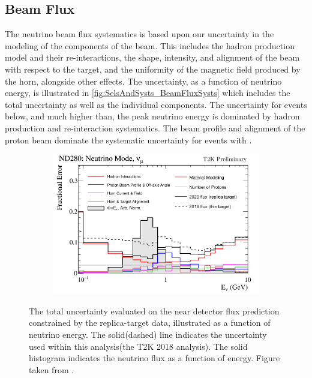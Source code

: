 \subsection{Beam Flux}
\label{sec:SelsAndSysts_Systs_BeamFlux}

The neutrino beam flux systematics is based upon our uncertainty in the modeling of the components of the beam. This includes the hadron production model and their re-interactions, the shape, intensity, and alignment of the beam with respect to the target, and the uniformity of the magnetic field produced by the horn, alongside other effects. The uncertainty, as a function of neutrino energy, is illustrated in \autoref{fig:SelsAndSysts_BeamFluxSysts} which includes the total uncertainty as well as the individual components. The uncertainty for events below, and much higher than, the peak neutrino energy is dominated by hadron production and re-interaction systematics. The beam profile and alignment of the proton beam dominate the systematic uncertainty for events with . 

\begin{figure}[h]
  \begin{subfigure}[t]{\textwidth}
    \includegraphics[width=\textwidth, trim={0mm 0mm 0mm 0mm}, clip,page=1]{Figures/Selections/flux_uncertainty_covariance_plots_addcorrnd_compwv3_flux_error_t2k_nd5_fhc_numu.pdf}
  \end{subfigure}
  \caption{The total uncertainty evaluated on the near detector \quickmath{\nu_{\mu}} flux prediction constrained by the replica-target data, illustrated as a function of neutrino energy. The solid(dashed) line indicates the uncertainty used within this analysis(the T2K 2018 analysis). The solid histogram indicates the neutrino flux as a function of energy. Figure taken from \cite{t2k_tn_354}.}
  \label{fig:SelsAndSysts_BeamFluxSysts}
\end{figure}


